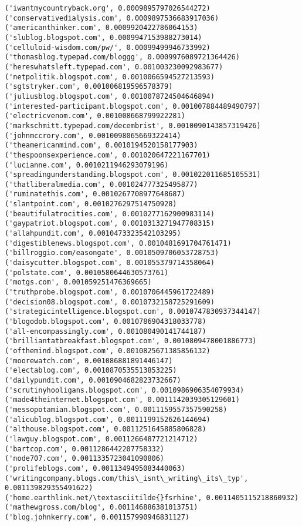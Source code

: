 \documentclass[11pt]{article}
\begin{document}
\begin{Verbatim}[commandchars=\\\{\}]
('iwantmycountryback.org', 0.0009895797026544272)
('conservativedialysis.com', 0.0009897536683917036)
('americanthinker.com', 0.0009920422786064153)
('slublog.blogspot.com', 0.0009947153988273014)
('celluloid-wisdom.com/pw/', 0.00099499946733992)
('thomasblog.typepad.com/bloggg', 0.0009976089721364426)
('hereswhatsleft.typepad.com', 0.001003230092983677)
('netpolitik.blogspot.com', 0.0010066594527213593)
('sgtstryker.com', 0.001006819596578379)
('juliusblog.blogspot.com', 0.0010078724504646894)
('interested-participant.blogspot.com', 0.001007884489490797)
('electricvenom.com', 0.001008668799922281)
('markschmitt.typepad.com/decembrist', 0.0010090143857319426)
('johnmccrory.com', 0.0010098065669322414)
('theamericanmind.com', 0.0010194520158177903)
('thespoonsexperience.com', 0.001020647221167701)
('lucianne.com', 0.0010211946293079196)
('spreadingunderstanding.blogspot.com', 0.001022011685105531)
('thatliberalmedia.com', 0.001024777325495877)
('ruminatethis.com', 0.0010267708977648687)
('slantpoint.com', 0.0010276297514750928)
('beautifulatrocities.com', 0.0010277162900983114)
('gaypatriot.blogspot.com', 0.0010313271947708315)
('allahpundit.com', 0.0010473323542103295)
('digestiblenews.blogspot.com', 0.0010481691704761471)
('billroggio.com/easongate', 0.0010509706053728753)
('daisycutter.blogspot.com', 0.001055379714358064)
('polstate.com', 0.0010580644630573761)
('motgs.com', 0.001059251476369665)
('truthprobe.blogspot.com', 0.0010706445961722489)
('decision08.blogspot.com', 0.0010732158725291609)
('strategicintelligence.blogspot.com', 0.0010747830937344147)
('blogodob.blogspot.com', 0.0010786904318033778)
('all-encompassingly.com', 0.001080490141744187)
('brilliantatbreakfast.blogspot.com', 0.0010809478001886773)
('ofthemind.blogspot.com', 0.0010825671385856132)
('moorewatch.com', 0.001086881891446147)
('electablog.com', 0.0010870535513853225)
('dailypundit.com', 0.0010904682823732667)
('scrutinyhooligans.blogspot.com', 0.0010986906354079934)
('made4theinternet.blogspot.com', 0.0011142039305129601)
('messopotamian.blogspot.com', 0.0011159557357590258)
('alicublog.blogspot.com', 0.0011199152626144694)
('althouse.blogspot.com', 0.0011251645885806828)
('lawguy.blogspot.com', 0.0011266487721214712)
('bartcop.com', 0.0011286442207758332)
('node707.com', 0.0011335723041090806)
('prolifeblogs.com', 0.0011349495083440063)
('writingcompany.blogs.com/this\_isnt\_writing\_its\_typ', 0.001139829355491622)
('home.earthlink.net/\textasciitilde{}fsrhine', 0.0011405115218860932)
('mathewgross.com/blog', 0.001146886381013751)
('blog.johnkerry.com', 0.001157990946831127)

\end{Verbatim}
\end{document}
